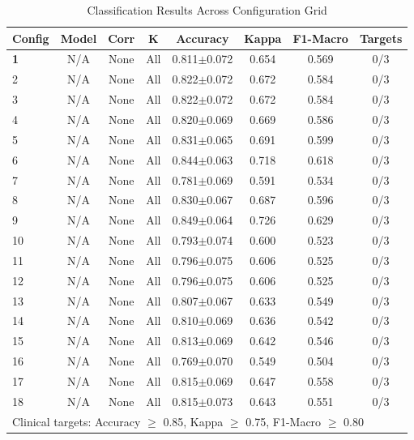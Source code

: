 
\begin{table}[h]
\centering
\caption{Classification Results Across Configuration Grid}
\label{tab:classification-results}
\footnotesize
\begin{tabular}{lccccccc}
\toprule
\textbf{Config} & \textbf{Model} & \textbf{Corr} & \textbf{K} & \textbf{Accuracy} & \textbf{Kappa} & \textbf{F1-Macro} & \textbf{Targets} \\
\midrule
\textbf{1} & N/A & None & All & 0.811$\pm$0.072 & 0.654 & 0.569 & 0/3 \\
2 & N/A & None & All & 0.822$\pm$0.072 & 0.672 & 0.584 & 0/3 \\
3 & N/A & None & All & 0.822$\pm$0.072 & 0.672 & 0.584 & 0/3 \\
4 & N/A & None & All & 0.820$\pm$0.069 & 0.669 & 0.586 & 0/3 \\
5 & N/A & None & All & 0.831$\pm$0.065 & 0.691 & 0.599 & 0/3 \\
6 & N/A & None & All & 0.844$\pm$0.063 & 0.718 & 0.618 & 0/3 \\
7 & N/A & None & All & 0.781$\pm$0.069 & 0.591 & 0.534 & 0/3 \\
8 & N/A & None & All & 0.830$\pm$0.067 & 0.687 & 0.596 & 0/3 \\
9 & N/A & None & All & 0.849$\pm$0.064 & 0.726 & 0.629 & 0/3 \\
10 & N/A & None & All & 0.793$\pm$0.074 & 0.600 & 0.523 & 0/3 \\
11 & N/A & None & All & 0.796$\pm$0.075 & 0.606 & 0.525 & 0/3 \\
12 & N/A & None & All & 0.796$\pm$0.075 & 0.606 & 0.525 & 0/3 \\
13 & N/A & None & All & 0.807$\pm$0.067 & 0.633 & 0.549 & 0/3 \\
14 & N/A & None & All & 0.810$\pm$0.069 & 0.636 & 0.542 & 0/3 \\
15 & N/A & None & All & 0.813$\pm$0.069 & 0.642 & 0.546 & 0/3 \\
16 & N/A & None & All & 0.769$\pm$0.070 & 0.549 & 0.504 & 0/3 \\
17 & N/A & None & All & 0.815$\pm$0.069 & 0.647 & 0.558 & 0/3 \\
18 & N/A & None & All & 0.815$\pm$0.073 & 0.643 & 0.551 & 0/3 \\

\bottomrule
\multicolumn{8}{l}{\small Clinical targets: Accuracy $\geq$ 0.85, Kappa $\geq$ 0.75, F1-Macro $\geq$ 0.80} \\
\end{tabular}
\end{table}
